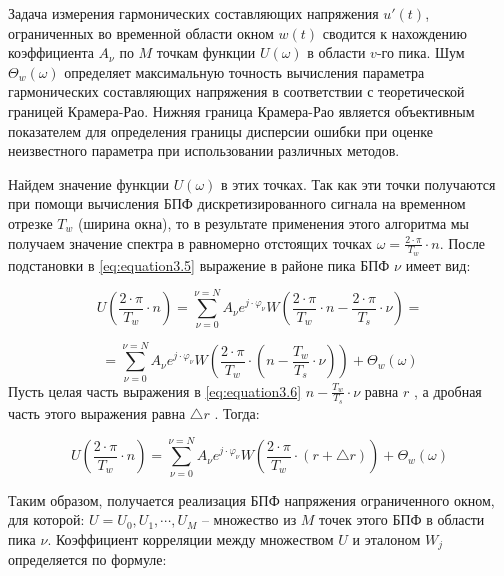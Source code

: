 Задача измерения гармонических составляющих напряжения $u'(t)$, ограниченных во временной области окном $w(t)$ сводится к нахождению коэффициента $A_\nu$ по $M$ точкам функции $U(\omega)$ в области $v$-го пика. Шум $\Theta_w(\omega) $   определяет максимальную точность вычисления параметра гармонических составляющих напряжения в соответствии с теоретической границей Крамера-Рао. Нижняя граница Крамера-Рао является объективным показателем для определения границы дисперсии ошибки при оценке неизвестного параметра при использовании различных методов. 

Найдем значение функции $U(\omega)$  в этих точках. Так как эти точки получаются при помощи вычисления БПФ дискретизированного сигнала на временном отрезке $T_w$ (ширина окна), то в результате применения этого алгоритма мы получаем значение спектра в равномерно отстоящих точках $ \omega = \frac{2 \cdot \pi}{T_w} \cdot n$. После подстановки   в \ref{eq:equation3.5} выражение в районе пика БПФ $\nu$ имеет вид:

\begin{equation}
	\label{eq:equation3.6}
	U \left(\frac{2 \cdot \pi}{T_w} \cdot n \right) = \displaystyle\sum_{\nu=0}^{\nu=N} A_{\nu} e^{j \cdot \varphi_\nu} W\left( {\frac{2 \cdot \pi}{T_w} \cdot n - \frac{2 \cdot \pi}{T_s} \cdot \nu }\right) = 
\end{equation}

\begin{equation}
\label{eq:equation3.6_1}
=  \displaystyle\sum_{\nu=0}^{\nu=N} A_{\nu} e^{j \cdot \varphi_\nu} W \left({\frac{2 \cdot \pi}{T_w} \cdot \left( {n - \frac{T_w}{T_s} \cdot \nu} \right) } \right) + \Theta_w(\omega)
\end{equation}	
Пусть целая часть выражения в \ref{eq:equation3.6} $ n - \frac{T_w}{T_s} \cdot \nu$  равна $r$ , а дробная часть этого выражения равна $ \bigtriangleup r$ . Тогда: 

\begin{equation}
	\label{eq:equation3.7}
	U \left(\frac{2 \cdot \pi}{T_w} \cdot n \right) = \displaystyle\sum_{\nu=0}^{\nu=N} A_{\nu} e^{j \cdot \varphi_\nu} W\left( {\frac{2 \cdot \pi}{T_w} \cdot (r + \bigtriangleup r ) }\right) + \Theta_w(\omega)
\end{equation}

Таким образом, получается реализация БПФ напряжения ограниченного окном, для которой: $U = {U_0, U_1, \cdots , U_M} $ – множество из $M$ точек этого БПФ в области пика $\nu$.
Коэффициент корреляции между множеством $U$ и эталоном $W_j$ определяется по формуле:


